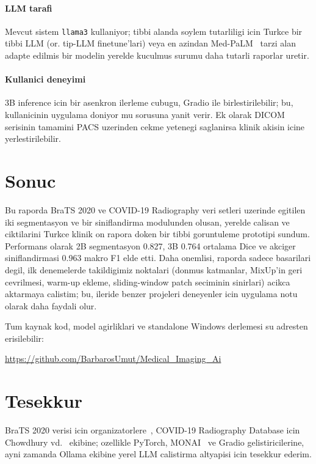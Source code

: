 \documentclass[conference]{IEEEtran}
\begin{document}
\paragraph{LLM tarafi} Mevcut sistem \texttt{llama3} kullaniyor; tibbi alanda
soylem tutarliligi icin Turkce bir tibbi LLM (or. tip-LLM finetune'lari) veya
en azindan Med-PaLM~\cite{singhal2023medpalm} tarzi alan adapte edilmis bir
modelin yerelde kuculmus surumu daha tutarli raporlar uretir.

\paragraph{Kullanici deneyimi} 3B inference icin bir asenkron ilerleme cubugu,
Gradio ile birlestirilebilir; bu, kullanicinin uygulama doniyor mu sorusuna
yanit verir. Ek olarak DICOM serisinin tamamini PACS uzerinden cekme yetenegi
saglanirsa klinik akisin icine yerlestirilebilir.

\section{Sonuc}

Bu raporda BraTS 2020 ve COVID-19 Radiography veri setleri uzerinde egitilen
iki segmentasyon ve bir siniflandirma modulunden olusan, yerelde calisan ve
ciktilarini Turkce klinik on rapora doken bir tibbi goruntuleme prototipi
sundum. Performans olarak 2B segmentasyon 0.827, 3B 0.764 ortalama Dice ve
akciger siniflandirmasi 0.963 makro F1 elde etti. Daha onemlisi, raporda
sadece basarilari degil, ilk denemelerde takildigimiz noktalari (donmus
katmanlar, MixUp'in geri cevrilmesi, warm-up ekleme, sliding-window patch
seciminin sinirlari) acikca aktarmaya calistim; bu, ileride benzer projeleri
deneyenler icin uygulama notu olarak daha faydali olur.

Tum kaynak kod, model agirliklari ve standalone Windows derlemesi su adresten
erisilebilir:
\begin{center}
\url{https://github.com/BarbarosUmut/Medical_Imaging_Ai}
\end{center}

\section*{Tesekkur}

BraTS 2020 verisi icin organizatorlere~\cite{menze2015brats,bakas2017advancing},
COVID-19 Radiography Database icin Chowdhury vd.~\cite{chowdhury2020covid}
ekibine; ozellikle PyTorch, MONAI~\cite{cardoso2022monai} ve Gradio
gelistiricilerine, ayni zamanda Ollama ekibine yerel LLM calistirma altyapisi
icin tesekkur ederim.



\end{document}
